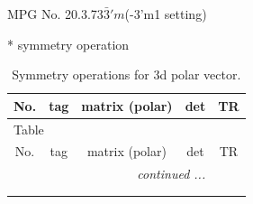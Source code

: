 \documentclass[fleqn,8pt]{jsarticle}
\begin{document}
\setcounter{MaxMatrixCols}{32}

\renewcommand{\tablename}{Table~}
\renewcommand{\figurename}{Figure~}
\begin{center}
\LARGE
MPG No. 20.3.73\quad$\bar{3}'m$\quad(-3'm1 setting)
\end{center}
* symmetry operation
\renewcommand{\arraystretch}{1.3}
\begin{longtable}{ccccc}
\caption{Symmetry operations for 3d polar vector.}
 \\
 \hline \hline
No. & tag & matrix (polar) & det & TR \\ \hline \endfirsthead

\multicolumn{4}{l}{\tablename\ \thetable{}} \\
 \hline \hline
No. & tag & matrix (polar) & det & TR \\ \hline \endhead

 \hline \hline
\multicolumn{4}{r}{\footnotesize\it continued ...} \\ \endfoot

 \hline \hline
\multicolumn{4}{r}{} \\ \endlastfoot


\end{longtable}
\end{document}
